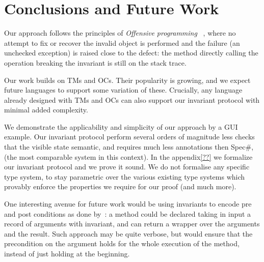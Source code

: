\section{Conclusions and Future Work}
Our approach follows the principles of \emph{Offensive programming}
~\cite{stephens2015beginning}, where 
no attempt to fix or recover the invalid object is performed and
 the failure (an unchecked exception)
		is raised close to the defect: the method directly calling the operation breaking the invariant is still on the stack trace.


Our work builds on TMs and OCs.
Their popularity is growing, and we expect future languages to support some variation of these.
Crucially, any language already designed with TMs and OCs
can also support our invariant protocol with minimal added complexity.


We demonstrate the applicability and simplicity of our approach by a GUI example.
Our invariant protocol perform several orders of magnitude less checks that the visible state semantic,
and requires much less annotations 
then Spec\#, (the most comparable system in this context).
In the appendix\ref{??}
we formalize our invariant protocol and we prove it sound. We do not formalise any specific type system, to stay parametric over the various existing type systems which provably enforce the properties we require for our proof (and much more).


One interesting avenue for future work would be
using invariants to encode pre and post conditions
as done by~\cite{??}:%
a method could be declared taking in input a record of arguments with invariant, and can return a wrapper over the arguments and the result.
Such approach may be quite verbose, but would ensure that the precondition on the argument holds for the whole execution of the method, instead of just holding at the beginning.





